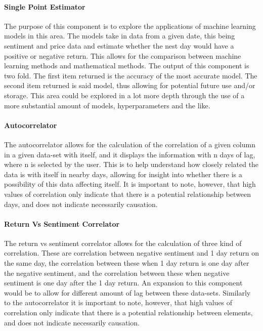 \paragraph{Single Point Estimator}

The purpose of this component is to explore the applications of machine learning models in this area. The models take in data from a given date, this being sentiment and price data and estimate whether the nest day would have a positive or negative return. This allows for the comparison between machine learning methods and mathematical methods. The output of this component is two fold. The first item returned is the accuracy of the most accurate model. The second item returned is said model, thus allowing for potential future use and/or storage. This area could be explored in a lot more depth through the use of a more substantial amount of models, hyperparameters and the like.

\paragraph{Autocorrelator}

The autocorrelator allows for the calculation of the correlation of a given column in a given data-set with itself, and it displays the information with n days of lag, where n is selected by the user. This is to help understand how closely related the data is with itself in nearby days, allowing for insight into whether there is a possibility of this data affecting itself. It is important to note, however, that high values of correlation only indicate that there is a potential relationship between days, and does not indicate necessarily causation.

\paragraph{Return Vs Sentiment Correlator}

The return vs sentiment correlator allows for the calculation of three kind of correlation. These are correlation between negative sentiment and 1 day return on the same day, the correlation between these when 1 day return is one day after the negative sentiment, and the correlation between these when negative sentiment is one day after the 1 day return. An expansion to this component would be to allow for different amount of lag between these data-sets. Similarly to the autocorrelator it is important to note, however, that high values of correlation only indicate that there is a potential relationship between elements, and does not indicate necessarily causation.

